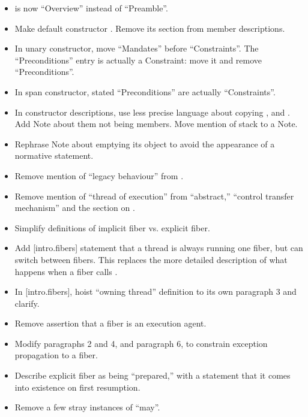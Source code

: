 
\begin{itemize}
    \item {} is now ``Overview'' instead of ``Preamble''.
    \item Make default \fiber constructor .
          Remove its section from member descriptions.
    \item In unary constructor, move ``Mandates'' before ``Constraints''. The
          ``Preconditions'' entry is actually a Constraint: move it and remove
          ``Preconditions''.
    \item In span constructor, stated ``Preconditions'' are actually ``Constraints''.
    \item In constructor descriptions, use less precise language about copying
          ,  and . Add Note about them not
          being \fiber members. Move mention of stack to a Note.
    \item Rephrase \resumewith Note about emptying its \fiber object to avoid
          the appearance of a normative statement.
    \item Remove mention of ``legacy behaviour'' from
          .
    \item Remove mention of ``thread of execution'' from ``abstract,''
          ``control transfer mechanism'' and the section on \exfns.
    \item Simplify definitions of implicit fiber vs. explicit fiber.
    \item Add [intro.fibers] statement that a thread is always running one
          fiber, but can switch between fibers. This replaces the more
          detailed description of what happens when a fiber calls \anyresume.
    \item In [intro.fibers], hoist ``owning thread'' definition to its own
          paragraph 3 and clarify.
    \item Remove assertion that a fiber is an execution agent.
    \item Modify  paragraphs 2 and 4, and 
          paragraph 6, to constrain exception propagation to a fiber.
    \item Describe explicit fiber as being ``prepared,'' with a statement that
          it comes into existence on first resumption.
    \item Remove a few stray instances of ``may''.

\end{itemize}
